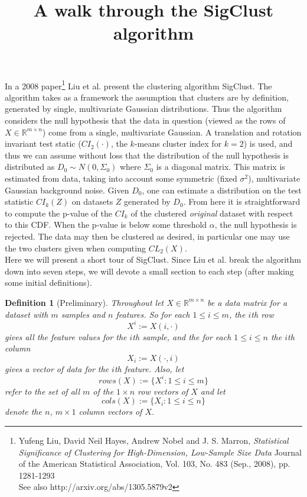 \documentclass{article}
\title{A walk through the SigClust algorithm}
\date{}
\author{}
\newtheorem{definition}[theorem]{Definition}
\begin{document}
\maketitle

%

In a 2008 paper\footnote{Yufeng Liu, David Neil Hayes, Andrew Nobel and J. S. Marron, \emph{Statistical Significance of Clustering for High-Dimension, Low-Sample Size Data} Journal of the American Statistical Association, Vol. 103, No. 483 (Sep., 2008), pp. 1281-1293\\ See also http://arxiv.org/abs/1305.5879v2}
Liu et al. present the clustering algorithm SigClust. The algorithm takes as a framework the assumption that clusters are by definition, generated by single, multivariate Gaussian distributions. Thus the algorithm considers the null hypothesis that the data in question (viewed as the rows of $X\in \mathbb{R}^{m \times n}$) come from a single, multivariate Gaussian.  A translation and rotation invariant test static ($CI_{2}(\cdot)$, the $k$-means cluster index for $k=2$) is used, and thus we can assume without loss that the distribution of the null hypothesis is distributed as $D_{0} \sim N(0, \Sigma_{0})$ where $\Sigma_{0}$ is a diagonal matrix. This matrix is estimated from data, taking into account some symmetric (fixed $\sigma^{2}$), multivariate Gaussian background noise. Given $D_0$, one can estimate a distribution on the test statistic $CI_{k}(Z)$ on datasets $Z$ generated by $D_0$. From here it is straightforward to compute the p-value of the $CI_{k}$ of the clustered \emph{original} dataset with respect to this CDF. When the p-value is below some threshold $\alpha$, the null hypothesis is rejected. The data may then be clustered as desired, in particular one may use the two clusters given when computing $CL_{2}(X)$.\\

\indent Here we will present a short tour of SigClust. Since Liu et al. break the algorithm down into seven steps, we will devote a small section to each step (after making some initial definitions). \\

\begin{definition}[Preliminary]
Throughout let $X\in \mathbb{R}^{m\times n}$ be a data matrix for a dataset with $m$ samples and $n$ features.
So for each $1 \leq i \leq m$, the $i$th \emph{row}
$$X^{i} := X(i,\cdot)$$
gives all the feature values for the $i$th \emph{sample}, and the for each $1\leq i \leq n$ the $i$th \emph{column}
$$X_{i} := X(\cdot, i)$$
 gives a vector of data for the $i$th \emph{feature}.
Also, let 
$$rows(X):= \{X^{i}: 1\leq i \leq m \}$$
refer to the set of all $m$ of the $1\times n$ row vectors of $X$ and let 
$$cols(X):=\{X_{i}: 1\leq i \leq n\}$$ denote the $n$, $m\times 1$ column vectors of $X$.
\end{definition}
\end{document}
